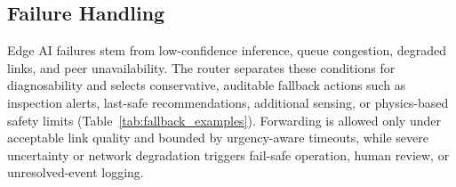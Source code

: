 \documentclass[10pt, conference]{IEEEtran}
\begin{document}



\subsection{Failure Handling}
Edge AI failures stem from low-confidence inference, queue congestion, degraded links, and peer unavailability. The router separates these conditions for diagnosability and selects conservative, auditable fallback actions such as inspection alerts, last-safe recommendations, additional sensing, or physics-based safety limits (Table~\ref{tab:fallback_examples}). Forwarding is allowed only under acceptable link quality and bounded by urgency-aware timeouts, while severe uncertainty or network degradation triggers fail-safe operation, human review, or unresolved-event logging.
\end{document}
